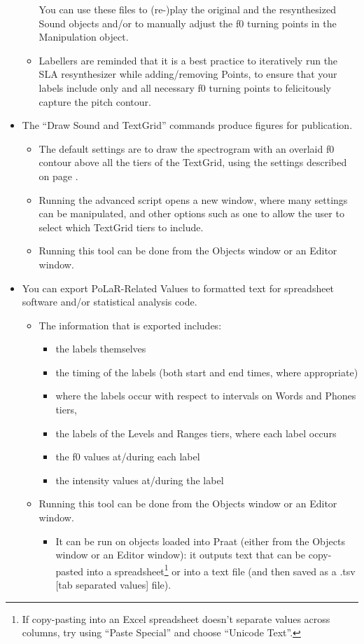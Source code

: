 \documentclass[11pt, twoside]{memoir}
\begin{document}
\begin{itemize}
\begin{itemize}
		You can use these files to (re-)play the original and the resynthesized Sound objects and/or to manually adjust the f0 turning points in the Manipulation object.
		\item Labellers are reminded that it is a best practice to iteratively run the SLA resynthesizer while adding\slash removing Points, to ensure that your labels include only and all necessary f0 turning points to felicitously capture the pitch contour.
	\end{itemize}
	\item The “Draw Sound and TextGrid” commands produce figures for publication.
	\begin{itemize}
		\item The default settings are to draw the spectrogram with an overlaid f0 contour above all the tiers of the TextGrid, using the settings described on page \pageref{note on praat settings}.
		\item Running the advanced script opens a new window, where many settings can be manipulated, and other options such as one to allow the user to select which TextGrid tiers to include.
		\item Running this tool can be done from the Objects window or an Editor window.
	\end{itemize}
	\item You can export PoLaR-Related Values to formatted text for spreadsheet software and/or statistical analysis code.
	\begin{itemize}
		\item The information that is exported includes:
			\begin{itemize}
			\item the labels themselves
			\item the timing of the labels (both start and end times, where appropriate)
			\item where the labels occur with respect to intervals on Words and Phones tiers, 
			\item the labels of the Levels and Ranges tiers, where each label occurs
			\item the f0 values at\slash during each label
			\item the intensity values at\slash during the label
			\end{itemize}
		\item Running this tool can be done from the Objects window or an Editor window.
		\begin{itemize}
			\item It can be run on objects loaded into Praat (either from the Objects window or an Editor window): it outputs text that can be copy-pasted into a spreadsheet\footnote{If copy-pasting into an Excel spreadsheet doesn’t separate values across columns, try using “Paste Special” and choose “Unicode Text”.} or into a text file (and then saved as a .tsv [tab separated values] file).

\end{itemize}
\end{itemize}
\end{itemize}
\end{document}
